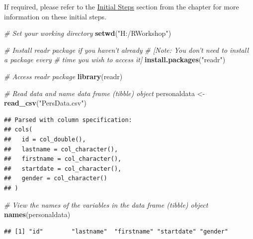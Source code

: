 \documentclass[]{book}
\newenvironment{Shaded}{\begin{snugshade}}{\end{snugshade}}
\newcommand{\KeywordTok}[1]{\textcolor[rgb]{0.13,0.29,0.53}{\textbf{#1}}}
\newcommand{\StringTok}[1]{\textcolor[rgb]{0.31,0.60,0.02}{#1}}
\newcommand{\CommentTok}[1]{\textcolor[rgb]{0.56,0.35,0.01}{\textit{#1}}}
\newcommand{\NormalTok}[1]{#1}
\begin{document}
If required, please refer to the
\protect\hyperlink{initsteps_arrange}{Initial Steps} section from the
chapter for more information on these initial steps.

\begin{Shaded}
\begin{Highlighting}[]
\CommentTok{# Set your working directory}
\KeywordTok{setwd}\NormalTok{(}\StringTok{"H:/RWorkshop"}\NormalTok{)}
\end{Highlighting}
\end{Shaded}

\begin{Shaded}
\begin{Highlighting}[]
\CommentTok{# Install readr package if you haven't already}
\CommentTok{# [Note: You don't need to install a package every }
\CommentTok{# time you wish to access it]}
\KeywordTok{install.packages}\NormalTok{(}\StringTok{"readr"}\NormalTok{)}
\end{Highlighting}
\end{Shaded}

\begin{Shaded}
\begin{Highlighting}[]
\CommentTok{# Access readr package}
\KeywordTok{library}\NormalTok{(readr)}

\CommentTok{# Read data and name data frame (tibble) object}
\NormalTok{personaldata <-}\StringTok{ }\KeywordTok{read_csv}\NormalTok{(}\StringTok{"PersData.csv"}\NormalTok{)}
\end{Highlighting}
\end{Shaded}

\begin{verbatim}
## Parsed with column specification:
## cols(
##   id = col_double(),
##   lastname = col_character(),
##   firstname = col_character(),
##   startdate = col_character(),
##   gender = col_character()
## )
\end{verbatim}

\begin{Shaded}
\begin{Highlighting}[]
\CommentTok{# View the names of the variables in the data frame (tibble) object}
\KeywordTok{names}\NormalTok{(personaldata)}
\end{Highlighting}
\end{Shaded}

\begin{verbatim}
## [1] "id"        "lastname"  "firstname" "startdate" "gender"
\end{verbatim}
\end{document}
